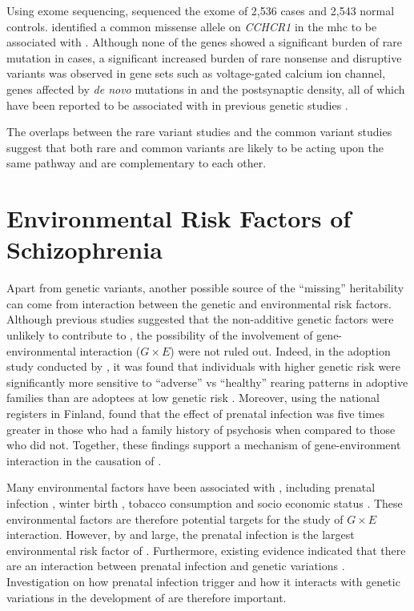 	Using exome sequencing, \citet{Purcell2014} sequenced the exome of 2,536  cases and 2,543 normal controls. 
	\citet{Purcell2014} identified a common missense allele on \textit{CCHCR1} in the \gls{mhc} to be associated with .
	Although none of the genes showed a significant burden of rare mutation in  cases, a significant increased burden of rare nonsense and disruptive variants was observed in gene sets such as voltage-gated calcium ion channel, genes affected by \textit{de novo} mutations in  \citep{Fromer2014} and the postsynaptic density, all of which have been reported to be associated with  in previous genetic studies \citep{Ripke2014}.

	The overlaps between the rare variant studies and the common variant studies suggest that both rare and common variants are likely to be acting upon the same pathway and are complementary to each other.
	
	\section{Environmental Risk Factors of Schizophrenia}
	Apart from genetic variants, another possible source of the ``missing'' heritability can come from interaction between the genetic and environmental risk factors.
	Although previous studies \citep{Gottesman01071967} suggested that the non-additive genetic factors were unlikely to contribute to , the possibility of the involvement of gene-environmental interaction ($G\times E$) were not ruled out.
	Indeed, in the adoption study conducted by \citet{Tienari2004}, it was found that individuals with higher genetic risk were significantly more sensitive to ``adverse'' vs ``healthy'' rearing patterns in adoptive families than are adoptees at low genetic risk \citep{Tienari2004}.
	Moreover, using the national registers in Finland, \citet{Clarke2009} found that the effect of prenatal infection was five times greater in those who had a family history of psychosis when compared to those who did not. 
	Together, these findings support a mechanism of gene-environment interaction in the causation of .
	
	Many environmental factors have been associated with , including prenatal infection \citep{Brown2010}, winter birth \citep{OCallaghan1991}, tobacco consumption \citep{Kelly1999} and socio economic status \citep{McGrath2008a}.
	These environmental factors are therefore potential targets for the study of $G\times E$ interaction.
	However, by and large, the prenatal infection is the largest environmental risk factor of .
	Furthermore, existing evidence indicated that there are an interaction between prenatal infection and genetic variations \citep{Clarke2009}.
	Investigation on how prenatal infection trigger  and how it interacts with genetic variations in the development of  are therefore important.	
	
